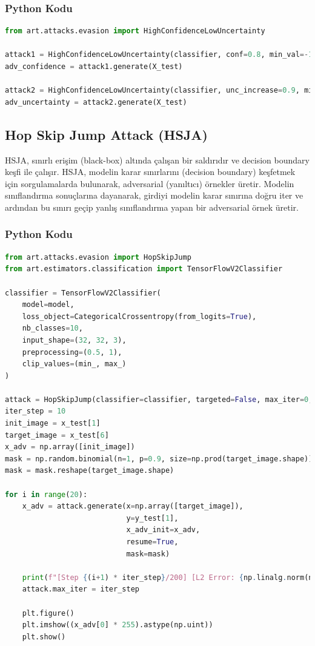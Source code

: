 \subsubsection{Python Kodu}

\begin{lstlisting}[language=Python]
from art.attacks.evasion import HighConfidenceLowUncertainty

attack1 = HighConfidenceLowUncertainty(classifier, conf=0.8, min_val=-1.0, max_val=2.0)
adv_confidence = attack1.generate(X_test)

attack2 = HighConfidenceLowUncertainty(classifier, unc_increase=0.9, min_val=0.0, max_val=2.0)
adv_uncertainty = attack2.generate(X_test)
\end{lstlisting}

\newpage

\subsection{Hop Skip Jump Attack (HSJA)}

HSJA, sınırlı erişim (black-box) altında çalışan bir saldırıdır ve decision boundary keşfi ile çalışır. HSJA, modelin karar sınırlarını (decision boundary) keşfetmek için sorgulamalarda bulunarak, adversarial (yanıltıcı) örnekler üretir. Modelin sınıflandırma sonuçlarına dayanarak, girdiyi modelin karar sınırına doğru iter ve ardından bu sınırı geçip yanlış sınıflandırma yapan bir adversarial örnek üretir.

\subsubsection{Python Kodu}

\begin{lstlisting}[language=Python]
from art.attacks.evasion import HopSkipJump
from art.estimators.classification import TensorFlowV2Classifier

classifier = TensorFlowV2Classifier(
    model=model,
    loss_object=CategoricalCrossentropy(from_logits=True),
    nb_classes=10,
    input_shape=(32, 32, 3),
    preprocessing=(0.5, 1),
    clip_values=(min_, max_)
)

attack = HopSkipJump(classifier=classifier, targeted=False, max_iter=0, max_eval=1000, init_eval=10)
iter_step = 10
init_image = x_test[1]
target_image = x_test[6]
x_adv = np.array([init_image])
mask = np.random.binomial(n=1, p=0.9, size=np.prod(target_image.shape))
mask = mask.reshape(target_image.shape)

for i in range(20):
    x_adv = attack.generate(x=np.array([target_image]),
                            y=y_test[1],
                            x_adv_init=x_adv, 
                            resume=True, 
                            mask=mask)

    print(f"[Step {(i+1) * iter_step}/200] [L2 Error: {np.linalg.norm(np.reshape(x_adv[0] - target_image, [-1])):.2f}]")
    attack.max_iter = iter_step

    plt.figure()
    plt.imshow((x_adv[0] * 255).astype(np.uint))
    plt.show()
\end{lstlisting}

